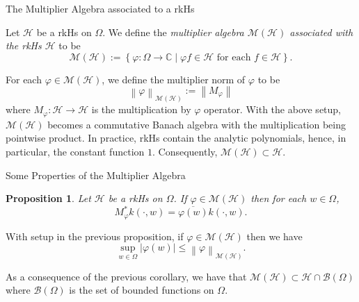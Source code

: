 \documentclass{beamer}
\newtheorem{proposition}[theorem]{Proposition}
\newcommand{\C}{\mathbb C}
\newcommand{\calB}{{\mathcal B}}
\newcommand{\calH}{{\mathcal H}}
\newcommand{\calM}{{\mathcal M}}
\newcommand{\norm}[1]{\left\lVert #1 \right\rVert}
\newcommand{\abs}[1]{\left\lvert #1 \right\rvert}
\begin{document}
\begin{frame}{The Multiplier Algebra associated to a rkHs}
\begin{definition}
Let $\calH$ be a rkHs on $\Omega$. We define the \textit{multiplier algebra $\calM \left( \calH \right)$ associated with the rkHs $\calH$} to be
\begin{equation*}
\calM \left( \calH \right) := \left\{ \varphi :  \Omega \to \C  \mid \varphi f \in \calH \text{ for each } f \in \calH \right\}.
\end{equation*}
\label{def:mult-alg}
\end{definition}
For each $\varphi \in \calM \left( \calH \right)$, we define the multiplier norm of $\varphi$ to be 
\begin{equation*}
\norm{\varphi}_{\calM \left( \calH \right)} := \norm{M_{\varphi}}
\end{equation*}
where $M_{\varphi} : \calH \to \calH$ is the multiplication by $\varphi$ operator.
\pause
With the above setup, $\calM \left( \calH \right)$ becomes a commutative Banach algebra with the multiplication being pointwise product.
\pause
In practice, rkHs contain the analytic polynomials, hence, in particular, the constant function $1$. Consequently, $\calM \left( \calH \right) \subset \calH$.
\end{frame}

\begin{frame}{Some Properties of the Multiplier Algebra}
\begin{proposition}
Let $\calH$ be a rkHs on $\Omega$. If $\varphi \in \calM \left( \calH \right)$ then for each $w\in \Omega$, 
\begin{equation*}
M_{\varphi}^{*} k\left( \cdot , w \right) = \overline{\varphi (w)} k\left( \cdot , w \right).
\end{equation*}
\end{proposition}
\pause
\begin{corollary}
With setup in the previous proposition, if $\varphi \in \calM \left( \calH \right)$ then we have
\begin{equation*}
\sup_{w\in \Omega} \abs{\varphi (w)} \le \norm{\varphi}_{\calM \left( \calH \right)}.
\end{equation*}
\label{cor:boundedness-of-multiplier}
\end{corollary}
\pause
\label{prop:adjoint-eigenvalue}
As a consequence of the previous corollary, we have that $\calM \left( \calH \right) \subset \calH \cap \calB \left( \Omega \right)$ where $\calB \left( \Omega \right)$ is the set of bounded functions on $\Omega$.
\end{frame}
\end{document}
